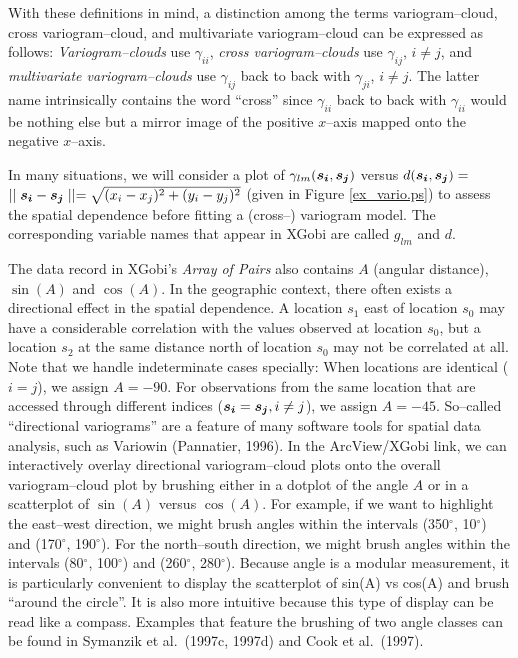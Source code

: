 With these definitions in mind, a distinction among the terms
variogram--cloud, cross variogram--cloud, and multivariate
variogram--cloud can be expressed as follows: {\it Variogram--clouds}
use $\gamma_{ii}$, {\it cross variogram--clouds} use
$\gamma_{ij}$, $i \neq j$, and {\it multivariate variogram--clouds}
use $\gamma_{ij}$ back to back with $\gamma_{ji}$, $i \neq
j$. The latter name intrinsically contains the word ``cross'' since
$\gamma_{ii}$ back to back with $\gamma_{ii}$ would be nothing else
but a mirror image of the positive $x$--axis mapped onto the negative
$x$--axis.

In many situations, we will consider a plot of $\gamma_{lm}
(\mbox{\boldmath$s_i$}, \mbox{\boldmath$s_j$})$ versus $d
(\mbox{\boldmath$s_i$}, \mbox{\boldmath$s_j$}) =$   $\mid\mid
\mbox{\boldmath$s_i$} - \mbox{\boldmath$s_j$} \mid\mid = \sqrt{(x_i -
x_j)^2 + (y_i - y_j)^2}$ (given in Figure \ref{ex_vario.ps}) to assess
the spatial dependence before fitting a (cross--) variogram model. The
corresponding variable names that appear in XGobi are called $g_{lm}$
and $d$.

The data record in XGobi's {\it Array of Pairs}
also contains $A$ (angular distance),
$\sin(A)$ and $\cos(A)$. In the geographic context, there often exists
a directional effect in the spatial dependence. A location
\mbox{\boldmath$s_1$} east of location \mbox{\boldmath$s_0$} may have
a considerable correlation with the values observed at location
\mbox{\boldmath$s_0$}, but a location \mbox{\boldmath$s_2$} at the
same distance north of location \mbox{\boldmath$s_0$} may not be
correlated at all. Note that we handle indeterminate cases
specially: When locations are identical ($i=j$), we assign $A=-90$. For
observations from the same location that are accessed through
different indices ($\mbox{\boldmath$s_i$} =
\mbox{\boldmath$s_j$}, i \neq j$), we assign $A=-45$.  So--called
``directional variograms'' are a feature of many software tools for
spatial data analysis, such as Variowin (Pannatier, 1996).  In the
ArcView/XGobi link, we can interactively overlay directional
variogram--cloud plots onto the overall variogram--cloud plot by
brushing either in a dotplot of the angle $A$ or in a scatterplot of
$\sin(A)$ versus $\cos(A)$. For example, if we want to highlight the
east--west direction, we might brush angles within the intervals
(350$^\circ$, 10$^\circ$) and (170$^\circ$, 190$^\circ$).  For the
north--south direction, we might brush angles within the intervals
(80$^\circ$, 100$^\circ$) and (260$^\circ$, 280$^\circ$).  Because
angle is a modular measurement, it is particularly convenient to
display the scatterplot of sin(A) vs cos(A) and brush ``around the
circle''. It is also more intuitive because this type of display can
be read like a compass.  Examples that feature the brushing of two
angle classes can be found in Symanzik et al.\ (1997c, 1997d) and Cook
et al.\ (1997).


